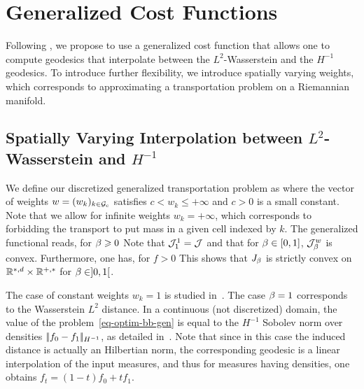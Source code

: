 \section{Generalized Cost Functions}
\label{sec-generalized}

Following \cite{dolbeault2009,Cardaliaguet2012}, we propose to use a generalized cost function that allows one to compute geodesics that interpolate between the $L^2$-Wasserstein and the $H^{-1}$ geodesics. To introduce further flexibility, we introduce spatially varying weights, which corresponds to approximating a transportation problem on a Riemannian manifold.


\subsection{Spatially Varying Interpolation between $L^2$-Wasserstein and $H^{-1}$ }\label{sec:generalized_cost}


We define our discretized generalized transportation problem as
where the vector of weights $w = (w_k)_{k \in \mathcal{G}_{\text{c}}}$ satisfies $c < w_k \leq +\infty$ and  $c>0$ is a small constant. Note that we allow for infinite weights $w_k=+\infty$, which corresponds to forbidding the transport to put mass in a given cell indexed by $k$. The generalized functional   reads, for $\beta \geqslant 0 $
Note that $\mathcal{J}_1^1 = \mathcal{J}$ and that for $\beta \in [0,1]$, $\mathcal{J}_\beta^w$ is convex. 
Furthermore, one has, for $f>0$  
This shows that $J_\beta$ is strictly convex on $\mathbb{R}^{*,d} \times \mathbb{R}^{+,*}$ for $\beta \in ]0,1[$.

The case of constant weights $w_k=1$ is studied in~\cite{dolbeault2009,Cardaliaguet2012}. The case $\beta=1$ corresponds to the Wasserstein $L^2$ distance. In a continuous (not discretized) domain, the value of the problem~\eqref{eq-optim-bb-gen} is equal to the $H^{-1}$ Sobolev norm over densities $|\!| f_0-f_1 |\!|_{H^{-1}}$, as detailed in~\cite{dolbeault2009}. Note that since in this case the induced distance is actually an Hilbertian norm, the corresponding geodesic is a linear interpolation of the input measures, and thus for measures having densities, one obtains $f_t = (1-t) f_0 + t f_1$.

